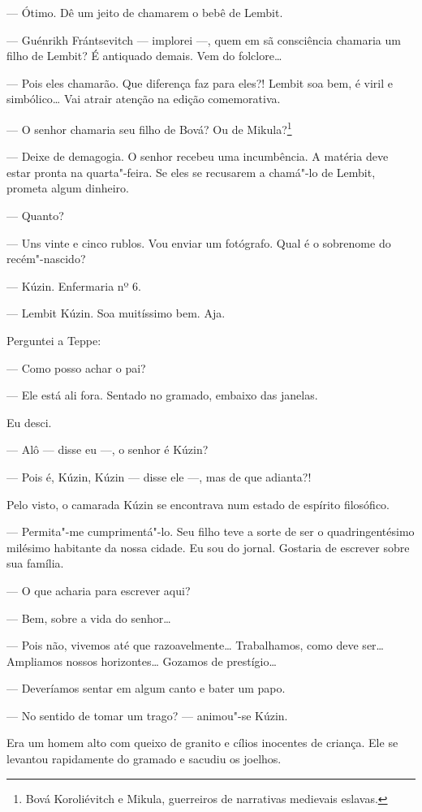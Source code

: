 --- Ótimo. Dê um jeito de chamarem o bebê de Lembit.

--- Guénrikh Frántsevitch --- implorei ---, quem em sã consciência
chamaria um filho de Lembit? É antiquado demais. Vem do folclore\ldots{}

--- Pois eles chamarão. Que diferença faz para eles?! Lembit soa bem, é
viril e simbólico\ldots{} Vai atrair atenção na edição comemorativa.

--- O senhor chamaria seu filho de Bová? Ou de Mikula?\footnote{Bová
  Koroliévitch e Mikula, guerreiros de narrativas medievais eslavas.}

--- Deixe de demagogia. O senhor recebeu uma incumbência. A matéria deve
estar pronta na quarta"-feira. Se eles se recusarem a chamá"-lo de Lembit,
prometa algum dinheiro.

--- Quanto?

--- Uns vinte e cinco rublos. Vou enviar um fotógrafo. Qual é o
sobrenome do recém"-nascido?

--- Kúzin. Enfermaria nº 6.

--- Lembit Kúzin. Soa muitíssimo bem. Aja.

Perguntei a Teppe:

--- Como posso achar o pai?

--- Ele está ali fora. Sentado no gramado, embaixo das janelas.

Eu desci.

--- Alô --- disse eu ---, o senhor é Kúzin?

--- Pois é, Kúzin, Kúzin --- disse ele ---, mas de que adianta?!

Pelo visto, o camarada Kúzin se encontrava num estado de espírito
filosófico.

--- Permita"-me cumprimentá"-lo. Seu filho teve a sorte de ser o
quadringentésimo milésimo habitante da nossa cidade. Eu sou do jornal.
Gostaria de escrever sobre sua família.

--- O que acharia para escrever aqui?

--- Bem, sobre a vida do senhor\ldots{}

--- Pois não, vivemos até que razoavelmente\ldots{} Trabalhamos, como deve
ser\ldots{} Ampliamos nossos horizontes\ldots{} Gozamos de prestígio\ldots{}

--- Deveríamos sentar em algum canto e bater um papo.

--- No sentido de tomar um trago? --- animou"-se Kúzin.

Era um homem alto com queixo de granito e cílios inocentes de criança.
Ele se levantou rapidamente do gramado e sacudiu os joelhos.

